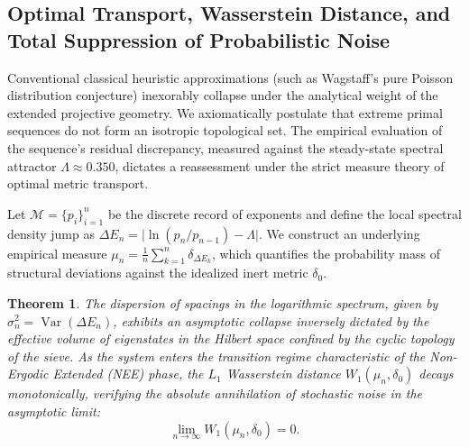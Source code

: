 \documentclass{article}
\numberwithin{equation}{section}
\DeclareMathOperator{\Var}{Var}
\theoremstyle{plain}
\newtheorem{theorem}{Theorem}[section]
\theoremstyle{definition}
\begin{document}
\subsection{Optimal Transport, Wasserstein Distance, and Total Suppression of Probabilistic Noise}

Conventional classical heuristic approximations (such as Wagstaff's pure Poisson distribution conjecture) inexorably collapse under the analytical weight of the extended projective geometry. We axiomatically postulate that extreme primal sequences do not form an isotropic topological set. The empirical evaluation of the sequence's residual discrepancy, measured against the steady-state spectral attractor $\Lambda \approx 0.350$, dictates a reassessment under the strict measure theory of optimal metric transport.

Let $\mathcal{M} = \{p_i\}_{i=1}^{n}$ be the discrete record of exponents and define the local spectral density jump as $\Delta E_n = \big\lvert \ln(p_n/p_{n-1}) - \Lambda \big\rvert$. We construct an underlying empirical measure $\mu_n = \frac{1}{n} \sum_{k=1}^n \delta_{\Delta E_k}$, which quantifies the probability mass of structural deviations against the idealized inert metric $\delta_0$.

\begin{theorem}
\label{teo:saturacion_wasserstein}
The dispersion of spacings in the logarithmic spectrum, given by $\sigma^2_n = \Var(\Delta E_n)$, exhibits an asymptotic collapse inversely dictated by the effective volume of eigenstates in the Hilbert space confined by the cyclic topology of the sieve. As the system enters the transition regime characteristic of the Non-Ergodic Extended (NEE) phase, the $L_1$ Wasserstein distance $W_1(\mu_n, \delta_0)$ decays monotonically, verifying the absolute annihilation of stochastic noise in the asymptotic limit:
\begin{equation}
    \lim_{n \to \infty} W_1(\mu_n, \delta_0) = 0.
\end{equation}
\end{theorem}
\end{document}
